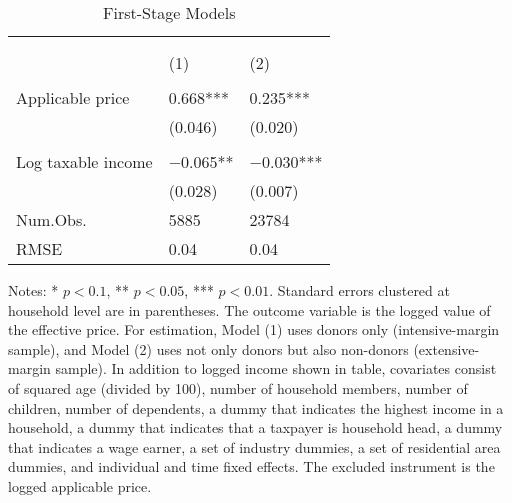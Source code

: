 \begin{table}

\caption{First-Stage Models\label{tab:main-stage1}}
\centering
\fontsize{8}{10}\selectfont
\begin{threeparttable}
\begin{tabular}[t]{l>{\centering\arraybackslash}p{18.75em}>{\centering\arraybackslash}p{18.75em}}
\toprule
\multicolumn{1}{c}{ } & \multicolumn{2}{c}{Effective price} \\
\cmidrule(l{3pt}r{3pt}){2-3}
\multicolumn{1}{c}{ } & \multicolumn{1}{c}{Donors (Intensive-margin)} & \multicolumn{1}{c}{Donors and Non-donors (Extensive-margin)} \\
\cmidrule(l{3pt}r{3pt}){2-2} \cmidrule(l{3pt}r{3pt}){3-3}
  & (1) & (2)\\
\midrule
\addlinespace[0.3em]
\multicolumn{3}{l}{\textit{Excluded instruments}}\\
\hspace{1em}Applicable price & \num{0.668}*** & \num{0.235}***\\
\hspace{1em} & (\num{0.046}) & (\num{0.020})\\
\addlinespace[0.3em]
\multicolumn{3}{l}{\textit{Covariates}}\\
\hspace{1em}Log taxable income & \num{-0.065}** & \num{-0.030}***\\
\hspace{1em} & (\num{0.028}) & (\num{0.007})\\
\midrule
Num.Obs. & \num{5885} & \num{23784}\\
RMSE & \num{0.04} & \num{0.04}\\
\bottomrule
\end{tabular}
\begin{tablenotes}
\item Notes: * $p < 0.1$, ** $p < 0.05$, *** $p < 0.01$. Standard errors clustered at household level are in parentheses. The outcome variable is the logged value of the effective price. For estimation, Model (1) uses donors only (intensive-margin sample), and Model (2) uses not only donors but also non-donors (extensive-margin sample). In addition to logged income shown in table, covariates consist of squared age (divided by 100), number of household members, number of children, number of dependents, a dummy that indicates the highest income in a household, a dummy that indicates that a taxpayer is household head, a dummy that indicates a wage earner, a set of industry dummies, a set of residential area dummies, and individual and time fixed effects. The excluded instrument is the logged applicable price.
\end{tablenotes}
\end{threeparttable}
\end{table}
